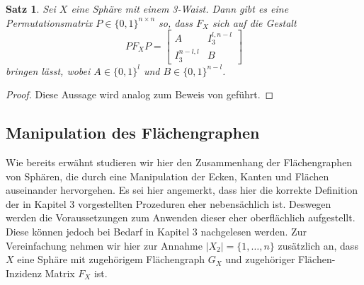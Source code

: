 \documentclass[12pt,titlepage,twoside,cleardoublepage]{article}
\theoremstyle{nummermitklammern}
\newtheorem{satz}[temp]{Satz}
\newtheorem{satz}[zahl]{Satz}
\numberwithin{equation}{section}
\begin{document}
\begin{satz}
Sei $X$ eine Sphäre mit einem 3-Waist. Dann gibt es eine Permutationsmatrix $P\in \{0,1\}^{n \times n}$ so, dass $F_X$ sich auf die Gestalt 
\[
PF_XP=
\left[ 
\begin{array}{c|c} 
  A & I^{l,n-l}_3 \\ 
  \hline 
  I^{n-l,l}_3 & B 
\end{array} 
\right]
\] 
bringen lässt, wobei $A\in \{0,1\}^{l}$ und $B\in \{0,1\}^{n-l}$.
\end{satz}
\begin{proof}
Diese Aussage wird analog zum Beweis von  geführt.
\end{proof}

\subsection{Manipulation des Flächengraphen }
Wie bereits erwähnt studieren wir hier den Zusammenhang der Flächengraphen von Sphären, die durch eine Manipulation der Ecken, Kanten und Flächen auseinander hervorgehen. Es sei hier angemerkt, dass hier die korrekte Definition der in Kapitel 3 vorgestellten Prozeduren eher nebensächlich ist. Deswegen werden die Voraussetzungen zum Anwenden dieser eher oberflächlich aufgestellt. Diese können jedoch bei Bedarf in Kapitel 3 nachgelesen werden. Zur Vereinfachung nehmen wir hier zur Annahme $\vert X_2 \vert =\{1,\ldots,n\}$ zusätzlich an, dass $X$ eine Sphäre mit zugehörigem Flächengraph $G_X$ und zugehöriger Flächen-Inzidenz Matrix $F_X$ ist.
\end{document}
